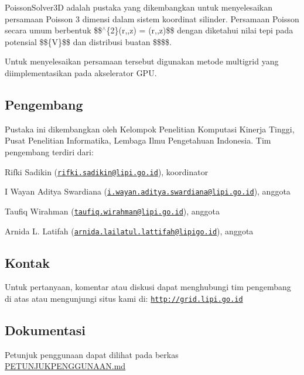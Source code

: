 Poisson\+Solver3D adalah pustaka yang dikembangkan untuk menyelesaikan persamaan Poisson 3 dimensi dalam sistem koordinat silinder. Persamaan Poisson secara umum berbentuk \$\$$^\wedge$\{2\}(r,,z) = (r,,z)\$\$ dengan diketahui nilai tepi pada potensial \$\$\{V\}\$\$ dan distribusi buatan \$\$\$\$.

Untuk menyelesaikan persamaan tersebut digunakan metode multigrid yang diimplementasikan pada akselerator G\+PU.

\subsection*{Pengembang}

Pustaka ini dikembangkan oleh Kelompok Penelitian Komputasi Kinerja Tinggi, Pusat Penelitian Informatika, Lembaga Ilmu Pengetahuan Indonesia. Tim pengembang terdiri dari\+:


\begin{DoxyItemize}
\item Rifki Sadikin (\href{mailto:rifki.sadikin@lipi.go.id}{\tt rifki.\+sadikin@lipi.\+go.\+id}), koordinator
\item I Wayan Aditya Swardiana (\href{mailto:i.wayan.aditya.swardiana@lipi.go.id}{\tt i.\+wayan.\+aditya.\+swardiana@lipi.\+go.\+id}), anggota
\item Taufiq Wirahman (\href{mailto:taufiq.wirahman@lipi.go.id}{\tt taufiq.\+wirahman@lipi.\+go.\+id}), anggota
\item Arnida L. Latifah (\href{mailto:arnida.lailatul.lattifah@lipigo.id}{\tt arnida.\+lailatul.\+lattifah@lipigo.\+id}), anggota \subsection*{Kontak}
\end{DoxyItemize}

Untuk pertanyaan, komentar atau diskusi dapat menghubungi tim pengembang di atas atau mengunjungi situs kami di\+: \href{http://grid.lipi.go.id}{\tt http\+://grid.\+lipi.\+go.\+id}

\subsection*{Dokumentasi}

Petunjuk penggunaan dapat dilihat pada berkas \hyperlink{PETUNJUKPENGGUNAAN_8md_source}{P\+E\+T\+U\+N\+J\+U\+K\+P\+E\+N\+G\+G\+U\+N\+A\+AN.md} 